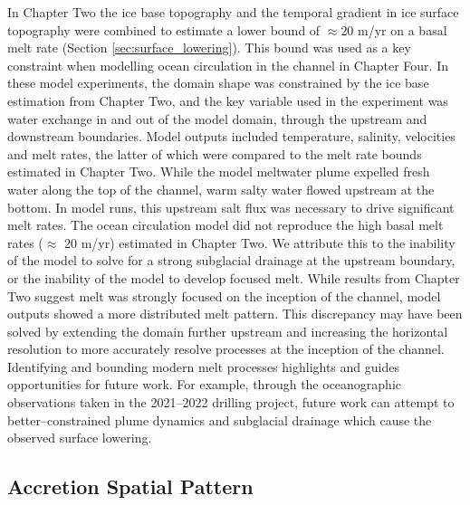 In Chapter Two the ice base topography and the temporal gradient in ice surface topography were combined to estimate a lower bound of $\approx$20 m/yr on a basal melt rate (Section \ref{sec:surface_lowering}). This bound was used as a key constraint when modelling ocean circulation in the channel in Chapter Four. 
In these model experiments, the domain shape was constrained by the ice base estimation from Chapter Two, and the key variable used in the experiment was water exchange in and out of the model domain, through the upstream and downstream boundaries. Model outputs included temperature, salinity, velocities and melt rates, the latter of which  were compared to the melt rate bounds estimated in Chapter Two. 
While the model meltwater plume expelled fresh water along the top of the channel, warm salty water flowed upstream at the bottom. In model runs, this upstream salt flux was necessary to drive significant melt rates.
The ocean circulation model did not reproduce the high basal melt rates ($\approx$ 20 m/yr) estimated in Chapter Two. We attribute this to the inability of the model to solve for a strong subglacial drainage at the upstream boundary, or the inability of the model to develop focused melt. While results from Chapter Two suggest melt was strongly focused on the inception of the channel, model outputs showed a more distributed melt pattern. This discrepancy may have been solved by extending the domain further upstream and increasing the horizontal resolution to more accurately resolve processes at the inception of the channel. 
Identifying and bounding modern melt processes highlights and guides opportunities for future work. For example, through the oceanographic observations taken in the 2021--2022 drilling project, future work can attempt to better--constrained plume dynamics and subglacial drainage which cause the observed surface lowering.  

\subsection{Accretion Spatial Pattern}

